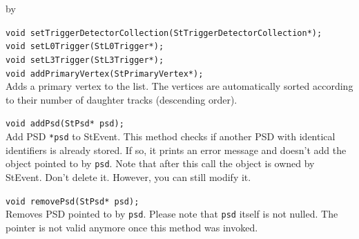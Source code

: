 \documentclass[twoside]{article}
\newcommand{\entrylabel}[1]{\mbox{\textbf{{#1}}}\hfil}%
\newenvironment{entry}
{\begin{list}{}%
    {\renewcommand{\makelabel}{\entrylabel}%
     \setlength{\labelwidth}{90pt}%
     \setlength{\leftmargin}{\labelwidth}
     \advance\leftmargin by \labelsep%
      }%
    }%
  {\end{list}}
\newcommand{\Entrylabel}[1]%
{\raisebox{0pt}[1ex][0pt]{\makebox[\labelwidth][l]%
    {\parbox[t]{\labelwidth}{\hspace{0pt}\textbf{{#1}}}}}}
\newenvironment{Entry}%
{\renewcommand{\entrylabel}{\Entrylabel}\begin{entry}}%
  {\end{entry}}
\begin{document}
\begin{Entry}
    \verb+void setTriggerDetectorCollection(StTriggerDetectorCollection*);+\\

    \verb+void setL0Trigger(StL0Trigger*);+\\
    
    \verb+void setL3Trigger(StL3Trigger*);+\\
    
    \verb+void addPrimaryVertex(StPrimaryVertex*);+\\
    Adds a primary vertex to the list. The vertices are
    automatically sorted according to their number of daughter
    tracks (descending order). 

    \verb+void addPsd(StPsd* psd);+\\
    Add PSD \texttt{*psd} to StEvent. This method checks if another
    PSD with identical identifiers is already stored. If so, it prints
    an error message and doesn't add the object pointed to by
    \texttt{psd}. Note that after this call the object is owned by StEvent.
    Don't delete it. However, you can still modify it.
    
    \verb+void removePsd(StPsd* psd);+\\
    Removes PSD pointed to by \texttt{psd}. Please note that \texttt{psd}
    itself is not nulled. The pointer is not valid anymore once this method
    was invoked.
    
\end{Entry}
\clearpage
\end{document}
